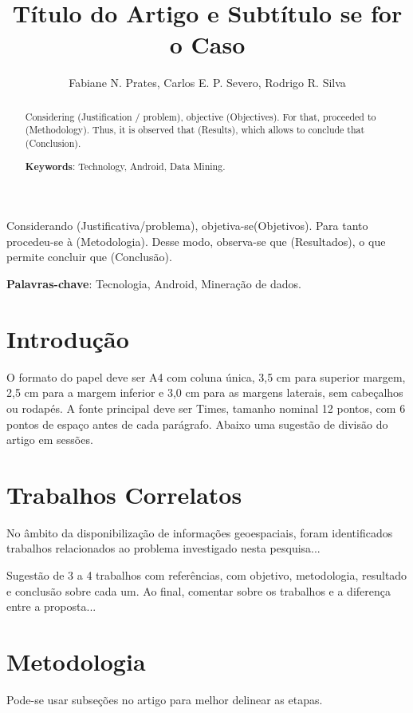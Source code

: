 \documentclass[12pt]{article}
\title{Título do Artigo e Subtítulo se for o Caso}
\author{Fabiane N. Prates\inst{1}, Carlos E. P. Severo\inst{1}, Rodrigo R. Silva\inst{2} }
\begin{document}
 

\maketitle

\begin{abstract}
  Considering (Justification / problem), objective (Objectives). For that, proceeded to (Methodology). Thus, it is observed that (Results), which allows to conclude that (Conclusion).
  
  \noindent
  \textbf{Keywords}: Technology, Android, Data Mining.
\end{abstract}

\begin{resumo} 
  Considerando (Justificativa/problema), objetiva-se(Objetivos). Para tanto procedeu-se à (Metodologia). Desse modo, observa-se que (Resultados), o que permite concluir que (Conclusão).
  
  \noindent
  \textbf{Palavras-chave}: Tecnologia, Android, Mineração de dados.
\end{resumo}


\section{Introdução}

O formato do papel deve ser A4 com coluna única, 3,5 cm para superior margem, 2,5 cm para a margem inferior e 3,0 cm para as margens laterais, sem cabeçalhos ou rodapés. A fonte principal deve ser Times, tamanho nominal 12 pontos, com 6 pontos de espaço antes de cada parágrafo. Abaixo uma sugestão de divisão do artigo em sessões.

\section{Trabalhos Correlatos} \label{sec:firstpage}
No âmbito da disponibilização de informações geoespaciais, foram identificados trabalhos relacionados ao problema investigado nesta pesquisa...

Sugestão de 3 a 4 trabalhos com referências, com objetivo, metodologia, resultado e conclusão sobre cada um. Ao final, comentar sobre os trabalhos e a diferença entre a proposta...


\section{Metodologia}
 Pode-se usar subseções no artigo para melhor delinear as etapas.
\end{document}
